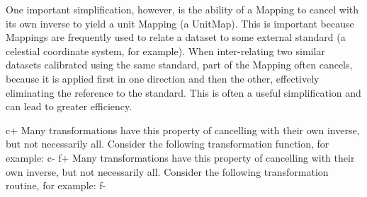 \documentclass[twoside,11pt]{article}
\begin{document}
One important simplification, however, is the ability of a Mapping to
cancel with its own inverse to yield a unit Mapping (a UnitMap). This
is important because Mappings are frequently used to relate a dataset
to some external standard (a celestial coordinate system, for
example). When inter-relating two similar datasets calibrated using
the same standard, part of the Mapping often cancels, because it is
applied first in one direction and then the other, effectively
eliminating the reference to the standard. This is often a useful
simplification and can lead to greater efficiency.

c+
Many transformations have this property of cancelling with their own
inverse, but not necessarily all. Consider the following
transformation function, for example:
c-
f+
Many transformations have this property of cancelling with their own
inverse, but not necessarily all. Consider the following
transformation routine, for example:
f-
\end{document}
